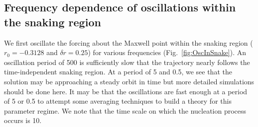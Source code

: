 \documentclass[pre,preprint,superscriptaddress]{revtex4-1}
\begin{document}
\subsection{Frequency dependence of oscillations within the snaking region}
We first oscillate the forcing about the Maxwell point within the snaking region ($r_0=-0.3128$ and $\delta r = 0.25$)  for various frequencies (Fig.~\ref{fig:OscInSnake}).   An oscillation period of 500 is sufficiently slow that the trajectory nearly follows the time-independent snaking region.  At a period of 5 and 0.5, we see that the solution may be approaching a steady orbit in time but more detailed simulations should be done here.  It may be that the oscillations are fast enough at a period of 5 or 0.5 to attempt some averaging techniques to build a theory for this parameter regime.   We note that the time scale on which the nucleation process occurs is 10.
\end{document}
